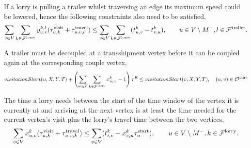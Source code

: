 If a lorry is pulling a trailer whilst traversing an edge its maximum speed could be lowered, hence the following constraints also need to be satisfied,
\begin{align}
  \sum_{v \in V} \sum_{k \in \mathcal F^{\rm lorry}} y^{k,l}_{u,v} (\tau_{u,k}^{\rm visit} + \tau_{u,v,l}^{\rm travel}) \leq \sum_{v \in V} \sum_{k \in \mathcal F^{\rm lorry}} (t_{u,v}^k - t_{v,u}^k),
  \qquad u\in V \setminus M^-, l \in \mathcal{F}^{\rm trailer}.
\end{align}


A trailer must be decoupled at a transshipment vertex before it can be coupled again at the corresponding couple vertex,
%
\begin{align}
  visitationStart(u, X,Y, T) +
  \left(  \sum_{w \in V} \sum_{k \in \mathcal F^{\rm lorry}} x^k_{u,w} -1 \right)
  \tau^R
  \leq
  visitationStart(v, X,Y, T) ,
  \quad (u,v) \in \mathcal E^{\rm pairs}
\end{align}

The time a lorry needs  between the start of the time window of the vertex it is currently at and arriving at the next vertex is at least the time needed for the current vertex's visit plus the lorry's travel time between the two vertices,
\begin{align}
  \sum_{v \in V} x_{u,v}^k (\tau_{u,k}^{\rm visit} + \tau_{u,v,k}^{\rm travel}) \leq \sum_{v \in V} (t_{i,v}^k - x^k_{v,u} \tau_u^{\rm start}),
  \qquad u\in V \setminus M^- , k \in \mathcal{F}^{\rm lorry}.
\end{align}




